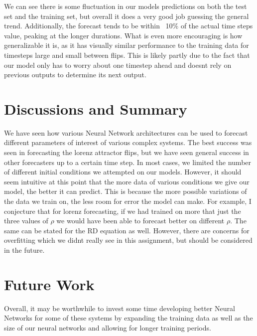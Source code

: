 \documentclass[12pt]{article}
\begin{document}
We can see there is some fluctuation in our models predictions on both the test set and the training set, but overall it does a very good job guessing the general trend. Additionally, the forecast tends to be within ~10\% of the actual time steps value, peaking at the longer durations. What is even more encouraging is how generalizable it is, as it has visually similar performance to the training data for timesteps large and small between flips. This is likely partly due to the fact that our model only has to worry about one timestep ahead and doesnt rely on previous outputs to determine its next output.
\section[see]{Discussions and Summary}
We have seen how various Neural Network architectures can be used to forecast different parameters of interest of various complex systems. The best success was seen in forecasting the lorenz attractor flips, but we have seen general success in other forecasters up to a certain time step. In most cases, we limited the number of different initial conditions we attempted on our models. However, it should seem intuitive at this point that the more data of various conditions we give our model, the better it can predict. This is because the more possible variations of the data we train on, the less room for error the model can make. For example, I conjecture that for lorenz forecasting, if we had trained on more that just the three values of $\rho$ we would have been able to forecast better on different $\rho$. The same can be stated for the RD equation as well. However, there are concerns for overfitting which we didnt really see in this assignment, but should be considered in the future.
\section{Future Work}
Overall, it may be worthwhile to invest some time developing better Neural Networks for some of these systems by expanding the training data as well as the size of our neural networks and allowing for longer training periods.
\end{document}
